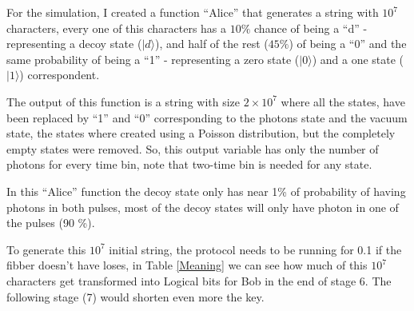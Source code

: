 \begin{refsection}
For the simulation, I created a function ``Alice'' that generates a string with $10^7$ characters, every one of this characters has a $10 \%$ chance of being a ``d'' - representing a decoy state ($|d\rangle$), and half of the rest ($45 \%$) of being a ``0'' and the same probability of being a ``1'' - representing a zero state ($|0\rangle$) and a one state ($|1\rangle$) correspondent. 

The output of this function is a string with size $2\times10^7$ where all the states, have been replaced by ``1'' and ``0'' corresponding to the photons state and the vacuum state, the states where created using a Poisson distribution, but the completely empty states were removed. So, this output variable has only the number of photons for every time bin, note that two-time bin is needed for any state.

In this ``Alice'' function the decoy state only has near 1\% of probability of having photons in both pulses, most of the decoy states will only have photon in one of the pulses (90 \%).

To generate this $10^7$ initial string, the protocol needs to be running for 0.1 if the fibber doesn't have loses, in Table \ref{Meaning} we can see how much of this $10^7$ characters get transformed into Logical bits for Bob in the end of stage 6. The following stage (7) would shorten even more the key.



\end{refsection}
